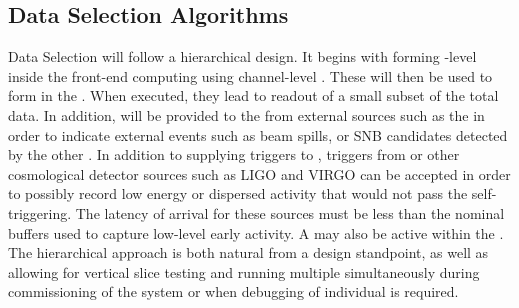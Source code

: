 

\subsection{Data Selection Algorithms}
\label{sec:fd-daq-sel}


Data Selection will follow a hierarchical design. 
It begins with forming -level 
inside the  front-end computing using channel-level
. 
These will then be used to form  
in the .
When executed, they lead to readout of a small subset of the total
data. 
In addition,  will be provided to the
 from external sources such as the  in order to
indicate external events such as beam spills, or SNB candidates
detected by the other . 
In addition to supplying triggers to , triggers from
 or other cosmological detector sources such as LIGO and
VIRGO can be accepted in order to possibly record low energy or
dispersed activity that would not pass the self-triggering. 
The latency of arrival for these sources must be less than the nominal
\snbpretime buffers used to capture low-level early 
activity.
A  may also be active within the . 
The hierarchical approach is both natural from a design standpoint, as
well as allowing for vertical slice testing and running multiple
 simultaneously during commissioning of the system or
when debugging of individual  is required.

